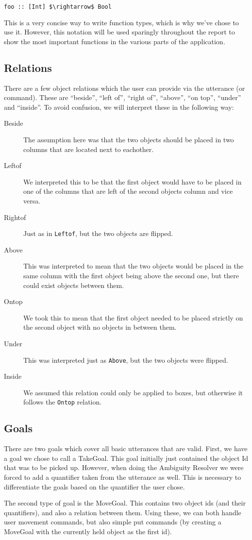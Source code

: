 \begin{lstlisting}
foo :: [Int] $\rightarrow$ Bool
\end{lstlisting}

This is a very concise way to write function types, which is why we've chose to use it. However, this notation will be used sparingly throughout the report to show the most important functions in the various parts of the application.

\subsection*{Relations}
There are a few object relations which the user can provide via the utterance (or command). These are ``beside'', ``left of'', ``right of'', ``above'', ``on top'', ``under'' and ``inside''. To avoid confusion, we will interpret these in the following way:

\begin{description}
  \item[Beside] The assumption here was that the two objects should be placed in
    two columns that are located next to eachother.
  \item[Leftof] We interpreted this to be that the first object would have to be
    placed in one of the columns that are left of the second objects column and
    vice versa.
  \item[Rightof] Just as in \verb|Leftof|, but the two objects are flipped.
  \item[Above] This was interpreted to mean that the two objects would be placed
    in the same column with the first object being above the second one, but
    there could exist objects between them.
  \item[Ontop] We took this to mean that the first object needed to be placed
   strictly on the second object with no objects in between them.
  \item[Under] This was interpreted just as \verb|Above|, but the two objects
    were flipped.
  \item[Inside] We assumed this relation could only be applied to boxes, but
  otherwise it follows the \verb|Ontop| relation.
\end{description}

\subsection*{Goals}
There are two goals which cover all basic utterances that are valid. First, we have a goal we chose to call a TakeGoal. This goal initially just contained the object Id that was to be picked up. However, when doing the Ambiguity Resolver we were forced to add a quantifier taken from the utterance as well. This is necessary to differentiate the goals based on the quantifier the user chose.

The second type of goal is the MoveGoal. This contains two object ids (and their quantifiers), and also a relation between them. Using these, we can both handle user movement commands, but also simple put commands (by creating a MoveGoal with the currently held object as the first id).
